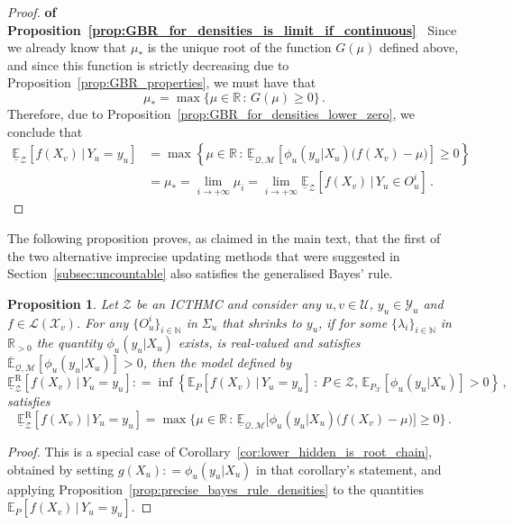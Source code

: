 \documentclass[3p]{elsarticle}
\newtheorem{proposition}[theorem]{Proposition}
\newcommand{\nats}{\mathbb{N}}
\newcommand{\reals}{\mathbb{R}}
\newcommand{\realspos}{\reals_{>0}}
\newcommand{\states}{\mathcal{X}}
\newcommand{\observs}{\mathcal{Y}}
\newcommand{\lexp}{\underline{\mathbb{E}}_{\rateset,\mathcal{M}}}
\newcommand{\uexp}{\overline{\mathbb{E}}_{\rateset,\mathcal{M}}}
\newcommand{\gambles}{\mathcal{L}}
\newcommand{\rateset}{\mathcal{Q}}
\newcommand{\coloneqq}{:\!=}
\begin{document}
\begin{proof}{\bf of Proposition~\ref{prop:GBR_for_densities_is_limit_if_continuous}~}
Since we already know that $\mu_*$ is the unique root of the function $G(\mu)$ defined above, and since this function is strictly decreasing due to Proposition~\ref{prop:GBR_properties}, we must have that
\begin{equation*}
\mu_* = \max\{\mu\in\reals\,:\, G(\mu)\geq 0\}\,.
\end{equation*}
Therefore, due to Proposition~\ref{prop:GBR_for_densities_lower_zero}, we conclude that
\begin{align*}
\underline{\mathbb{E}}_\mathcal{Z}[f(X_v)\,\vert\,Y_u=y_u] &= \max\left\{\mu\in\reals\,:\, \lexp\left[\phi_u(y_u\vert X_u)\bigl(f(X_v) - \mu\bigr)\right] \geq 0\right\} \\
 &= \mu_* = \lim_{i\to+\infty} \mu_i 
 = \lim_{i\to+\infty} \underline{\mathbb{E}}_\mathcal{Z}[f(X_v)\,\vert\,Y_u\in O_u^i]\,.
\end{align*}
\end{proof}

The following proposition proves, as claimed in the main text, that the first of the two alternative imprecise updating methods that were suggested in Section~\ref{subsec:uncountable} also satisfies the generalised Bayes' rule.
\begin{proposition}\label{prop:regular_is_computable}
Let $\mathcal{Z}$ be an ICTHMC and consider any $u,v\in\mathcal{U}$, $y_u\in\observs_u$ and $f\in\gambles(\states_v)$. For any $\{O_u^i\}_{i\in\nats}$ in $\Sigma_u$ that shrinks to $y_u$, if for some $\{\lambda_i\}_{i\in\nats}$ in $\realspos$ the quantity $\phi_u(y_u\vert X_u)$ exists, is real-valued and satisfies $\uexp[\phi_u(y_u\vert X_u)]>0$, then the model defined by
\begin{equation*}
\underline{\mathbb{E}}_\mathcal{Z}^\mathrm{R}[f(X_v)\,\vert\,Y_u=y_u] \coloneqq \inf\left\{\mathbb{E}_P[f(X_v)\,\vert\,Y_u=y_u]\,:\,P\in\mathcal{Z},\,\mathbb{E}_{P_\states}[\phi_u(y_u\vert X_u)]>0\right\}\,,
\end{equation*}
satisfies
\begin{equation*}
\underline{\mathbb{E}}_\mathcal{Z}^\mathrm{R}[f(X_v)\,\vert\,Y_u=y_u] = \max\{\mu\in\reals\,:\,\lexp\bigl[\phi_u(y_u\vert X_u)\bigl(f(X_v)-\mu\bigr)\bigr] \geq 0\}\,.
\end{equation*}
\end{proposition}
\begin{proof}
This is a special case of Corollary~\ref{cor:lower_hidden_is_root_chain}, obtained by setting $g(X_u)\coloneqq \phi_u(y_u\vert X_u)$ in that corollary's statement, and applying Proposition~\ref{prop:precise_bayes_rule_densities} to the quantities $\mathbb{E}_P[f(X_v)\,\vert\,Y_u=y_u]$.
\end{proof}
\end{document}
